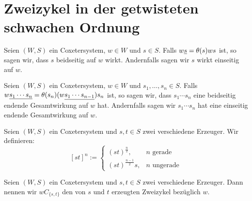 \section{Zweizykel in der getwisteten schwachen Ordnung}

\begin{defi}
Seien $(W,S)$ ein Coxetersystem, $w \in W$ und $s \in S$. Falls $w \underline{s} =
\theta(s)ws$ ist, so sagen wir, dass $s$ beidseitig auf $w$ wirkt.
Andernfalls sagen wir $s$ wirkt einseitig auf $w$.
\end{defi}

\begin{defi}
Seien $(W,S)$ ein Coxetersystem, $w \in W$ und $s_1,\ldots,s_n \in S$. Falls $w
\underline{s_1 \cdots s_n} = \theta(s_n)(w \underline{s_1 \cdots s_{n-1}}) s_n$ ist, so
sagen wir, dass $s_1 \cdots s_n$ eine beidseitig endende Gesamtwirkung auf
$w$ hat. Andernfalls sagen wir $s_1 \cdots s_n$ hat eine einseitig endende
Gesamtwirkung auf $w$.
\end{defi}

\begin{defi}
Seien $(W,S)$ ein Coxetersystem und $s,t \in S$ zwei
verschiedene Erzeuger. Wir definieren:
$$[st]^n :=
\begin{cases}
(st)^{\frac{n}{2}}, & n \textrm{ gerade} \\
(st)^{\frac{n-1}{2}}s, & n \textrm{ ungerade} 
\end{cases}$$
\end{defi}

\begin{defi}[Zweizykel]
Seien $(W,S)$ ein Coxetersystem und $s,t \in S$ zwei verschiedene Erzeuger. Dann
nennen wir $wC_{\{s,t\}}$  den von $s$ und $t$ erzeugten Zweizykel bezüglich
$w$.
\end{defi}

